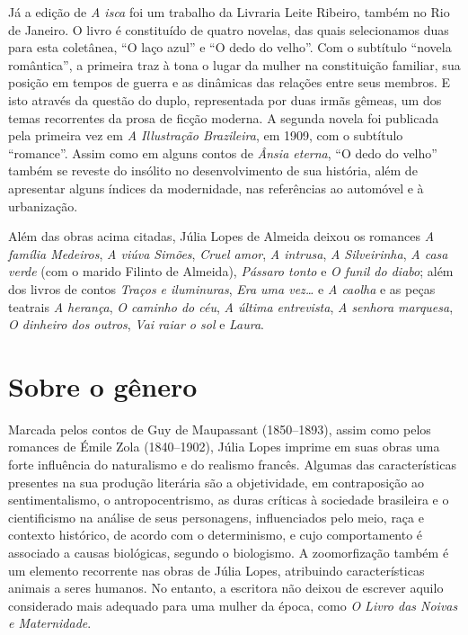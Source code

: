 Já a edição de \emph{A isca} foi um trabalho da Livraria Leite Ribeiro,
também no Rio de Janeiro. O livro é constituído de quatro novelas, das
quais selecionamos duas para esta coletânea, ``O laço azul'' e ``O dedo
do velho''. Com o subtítulo ``novela romântica'', a primeira traz à tona
o lugar da mulher na constituição familiar, sua posição em tempos de
guerra e as dinâmicas das relações entre seus membros. E isto através da
questão do duplo, representada por duas irmãs gêmeas, um dos temas
recorrentes da prosa de ficção moderna. A segunda novela foi publicada
pela primeira vez em \emph{A Illustração Brazileira}, em 1909, com o
subtítulo ``romance''. Assim como em alguns contos de \emph{Ânsia
eterna}, ``O dedo do velho'' também se reveste do insólito no
desenvolvimento de sua história, além de apresentar alguns índices da
modernidade, nas referências ao automóvel e à urbanização.

Além das obras acima citadas, Júlia Lopes de Almeida deixou os romances \textit{A família Medeiros}, \textit{A viúva Simões}, \textit{Cruel amor}, \textit{A intrusa},
\textit{A Silveirinha}, \textit{A casa verde} (com o marido Filinto de Almeida), \textit{Pássaro tonto} e \textit{O funil do diabo}; além dos livros de contos \textit{Traços e iluminuras}, \textit{Era uma vez\ldots} e \textit{A caolha} e as peças teatrais \textit{A herança}, \textit{O caminho do céu}, \textit{A última entrevista}, \textit{A senhora marquesa}, \textit{O dinheiro dos outros}, \textit{Vai raiar o sol} e \textit{Laura}.

\section{Sobre o gênero}

Marcada pelos contos de Guy de Maupassant (1850--1893), assim como pelos
romances de Émile Zola (1840--1902), Júlia Lopes imprime em suas obras
uma forte influência do naturalismo e do realismo francês. Algumas das
características presentes na sua produção literária são a objetividade,
em contraposição ao sentimentalismo, o antropocentrismo, as duras
críticas à sociedade brasileira e o cientificismo na análise de seus
personagens, influenciados pelo meio, raça e contexto histórico, de
acordo com o determinismo, e cujo comportamento é associado a causas
biológicas, segundo o biologismo. A zoomorfização também é um elemento
recorrente nas obras de Júlia Lopes, atribuindo características animais
a seres humanos. No entanto, a escritora não deixou de escrever aquilo
considerado mais adequado para uma mulher da época, como \emph{O Livro
das Noivas e Maternidade}.

